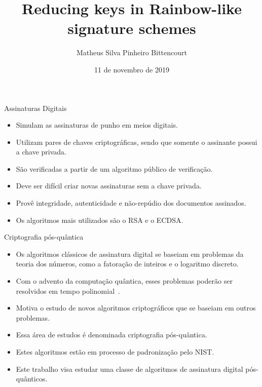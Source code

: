 \documentclass[]{beamer}
\title{Reducing keys in Rainbow-like signature schemes}
\author{
	Matheus Silva Pinheiro Bittencourt\inst{1}
}
\institute{
	\inst{1}
	\texttt{\href{mailto:matheus.spb@grad.ufsc.br}{matheus.spb@grad.ufsc.br}}\\
	Universidade Federal de Santa Catarina\\
	Departamento de Informática e Estatística
}
\date{11 de novembro de 2019}
\begin{document}
\frame{\titlepage}

\begin{frame}{Assinaturas Digitais}
	\begin{itemize}[<+->]
		\item Simulam as assinaturas de punho em meios digitais.
		\item Utilizam pares de chaves criptográficas, sendo que somente o
		assinante possui a chave privada.
		\item São verificadas a partir de um algoritmo público de verificação.
		\item Deve ser difícil criar novas assinaturas sem a chave privada.
		\item Provê integridade, autenticidade e não-repúdio dos documentos
		assinados.
		\item Os algoritmos mais utilizados são o RSA e o ECDSA.
	\end{itemize}
\end{frame}

\begin{frame}{Criptografia pós-quântica}
	\begin{itemize}[<+->]
		\item Os algoritmos clássicos de assinatura digital se baseiam em
		problemas da teoria dos números, como a fatoração de inteiros e o
		logaritmo discreto.
		\item Com o advento da computação quântica, esses problemas poderão ser
		resolvidos em tempo polinomial~\cite{shor1999polynomial}.
		\item Motiva o estudo de novos algoritmos criptográficos que se baseiam
		em outros problemas.
		\item Essa área de estudos é denominada criptografia pós-quântica.
		\item Estes algoritmos estão em processo de padronização pelo NIST.
		\item Este trabalho visa estudar uma classe de algoritmos de assinatura
		digital pós-quânticos.
	\end{itemize}
\end{frame}
\end{document}
